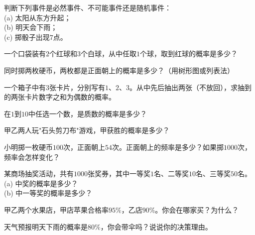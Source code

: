 \documentclass[a4paper,12pt]{ctexart}
\begin{document}
\begin{exercise}
\item 判断下列事件是必然事件、不可能事件还是随机事件：\\
  (a) 太阳从东方升起；\\
  (b) 明天会下雨；\\
  (c) 掷骰子出现$7$点。
\item 一个口袋装有$2$个红球和$3$个白球，从中任取$1$个球，取到红球的概率是多少？
\item 同时掷两枚硬币，两枚都是正面朝上的概率是多少？（用树形图或列表法）
\item 一个箱子中有$3$张卡片，分别写有$1$、$2$、$3$。从中先后抽出两张（不放回），求抽到的两张卡片数字之和为偶数的概率。
\item 在$1$到$10$中任选一个数，是质数的概率是多少？
\item 甲乙两人玩"石头剪刀布"游戏，甲获胜的概率是多少？
\end{exercise}

\newpage







\begin{exercise}
\item 小明掷一枚硬币$100$次，正面朝上$54$次。正面朝上的频率是多少？如果掷$1000$次，频率会怎样变化？
\item 某商场抽奖活动，共有$1000$张奖券，其中一等奖$1$名、二等奖$10$名、三等奖$50$名。\\
  (a) 中奖的概率是多少？\\
  (b) 中一等奖的概率是多少？
\item 甲乙两个水果店，甲店苹果合格率$95\%$，乙店$90\%$。你会在哪家买？为什么？
\item 天气预报明天下雨的概率是$80\%$，你会带伞吗？说说你的决策理由。
\end{exercise}
\end{document}
